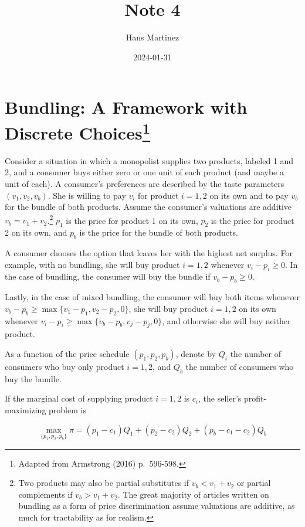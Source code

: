 \documentclass[
]{article}
\title{Note 4}
\author{Hans Martinez}
\date{2024-01-31}
\begin{document}
\maketitle

\section[Bundling: A Framework with Discrete
Choices]{\texorpdfstring{Bundling: A Framework with Discrete
Choices\footnote{Adapted from Armstrong (2016) p.~596-598.}}{Bundling: A Framework with Discrete Choices}}\label{bundling-a-framework-with-discrete-choicestaken}

Consider a situation in which a monopolist supplies two products,
labeled 1 and 2, and a consumer buys either zero or one unit of each
product (and maybe a unit of each). A consumer's preferences are
described by the taste parameters \((v_1 , v_2 , v_b )\). She is willing
to pay \(v_i\) for product \(i = 1, 2\) on its own and to pay \(v_b\)
for the bundle of both products. Assume the consumer's valuations are
additive \(v_b = v_1 + v_2\).\footnote{Two products may also be partial
  substitutes if \(v_b < v_1 + v_2\) or partial complements if
  \(v_b >v_1+v_2\). The great majority of articles written on bundling
  as a form of price discrimination assume valuations are additive, as
  much for tractability as for realism.} \(p_1\) is the price for
product 1 on its own, \(p_2\) is the price for product 2 on its own, and
\(p_b\) is the price for the bundle of both products.

A consumer chooses the option that leaves her with the highest net
surplus. For example, with no bundling, she will buy product \(i = 1,2\)
whenever \(v_i−p_i \ge 0\). In the case of bundling, the consumer will
buy the bundle if \(v_b-p_b\ge0\).

Lastly, in the case of mixed bundling, the consumer will buy both items
whenever \(v_b-p_b\ge \max{\{v_1−p_1,v_2−p_2,0\}}\), she will buy
product \(i = 1,2\) on its own whenever
\(v_i−p_i \ge \max\{v_b − p_b, v_j − p_j, 0\}\), and otherwise she will
buy neither product.

As a function of the price schedule \((p_1,p_2,p_b)\), denote by \(Q_i\)
the number of consumers who buy only product \(i=1,2\), and \(Q_b\) the
number of consumers who buy the bundle.

If the marginal cost of supplying product \(i=1,2\) is \(c_i\), the
seller's profit-maximizing problem is

\[
\max_{\{p_1,p_2,p_b\}} \pi=(p_1-c_1)Q_1 + (p_2-c_2)Q_2 + (p_b-c_1-c_2)Q_b
\]
\end{document}
